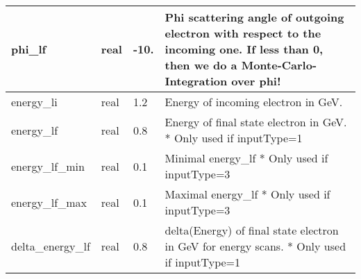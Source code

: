 \documentclass{article}
\begin{document}
\begin{longtable}{llll}
\midrule
phi\_lf & \begin{minipage}[t]{2cm}real\end{minipage} & \begin{minipage}[t]{2cm}-10.\end{minipage} & \begin{minipage}[t]{12cm}Phi scattering angle of outgoing electron with respect to the incoming one. If less than 0, then we do a Monte-Carlo-Integration over phi!\end{minipage}\\*
\midrule
energy\_li & \begin{minipage}[t]{2cm}real\end{minipage} & \begin{minipage}[t]{2cm}1.2\end{minipage} & \begin{minipage}[t]{12cm}Energy of incoming electron in GeV.\end{minipage}\\*
\midrule
energy\_lf & \begin{minipage}[t]{2cm}real\end{minipage} & \begin{minipage}[t]{2cm}0.8\end{minipage} & \begin{minipage}[t]{12cm}Energy of final state electron in GeV. * Only used if inputType=1\end{minipage}\\*
\midrule
energy\_lf\_min & \begin{minipage}[t]{2cm}real\end{minipage} & \begin{minipage}[t]{2cm}0.1\end{minipage} & \begin{minipage}[t]{12cm}Minimal energy\_lf * Only used if inputType=3\end{minipage}\\*
\midrule
energy\_lf\_max & \begin{minipage}[t]{2cm}real\end{minipage} & \begin{minipage}[t]{2cm}0.1\end{minipage} & \begin{minipage}[t]{12cm}Maximal energy\_lf * Only used if inputType=3\end{minipage}\\*
\midrule
delta\_energy\_lf & \begin{minipage}[t]{2cm}real\end{minipage} & \begin{minipage}[t]{2cm}0.8\end{minipage} & \begin{minipage}[t]{12cm}delta(Energy) of final state electron in GeV for energy scans. * Only used if inputType=1\end{minipage}\\*

\end{longtable}
\end{document}

